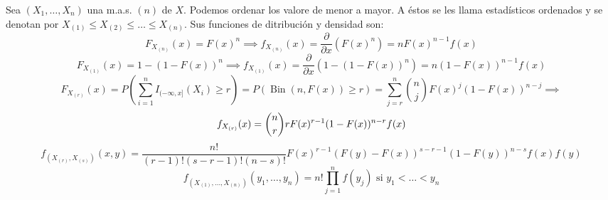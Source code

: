 \begin{definición}
Sea $\left(X_{1}, \ldots, X_{n}\right)$ una m.a.s. $(n)$ de $X$. Podemos ordenar los valore de menor a mayor. A éstos se les llama estadísticos ordenados y se denotan por $X_{(1)} \leq X_{(2)} \leq \ldots \leq X_{(n)}$.
Sus funciones de ditribución y densidad son:
$$F_{X_{(n)}}(x)=F(x)^{n} \implies f_{X_{(n)}}(x)= \frac{\partial}{\partial{x}}(F(x)^n) = n F(x)^{n-1} f(x)$$
$$F_{X_{(1)}}(x)=1-(1-F(x))^{n} \implies f_{X_{(1)}}(x)= \frac{\partial}{\partial{x}}(1-(1-F(x))^n) = n(1-F(x))^{n-1} f(x)$$
$$F_{X_{(r)}}(x) = P\left(\sum_{i=1}^{n} I_{(-\infty, x]}(X_i) \geq r\right) = P(\operatorname{Bin}(n, F(x)) \geq r) = \sum_{j=r}^{n} \binom{n}{j} F(x)^j(1-F(x))^{n-j} \implies$$  $$\\ f_{X_{(r)}}(x) = \binom{n}{r} r F(x)^{r-1}(1-F(x))^{n-r} f(x)$$
$$f_{\left(X_{(r)}, X_{(s)}\right)}(x, y) = \frac{n!}{(r-1)!(s-r-1)!(n-s)!} F(x)^{r-1}(F(y)-F(x))^{s-r-1}(1-F(y))^{n-s} f(x) f(y)$$
$$f_{\left(X_{(1)}, \ldots, X_{(n)}\right)}(y_1, \ldots, y_n) = n! \prod_{j=1}^{n} f(y_j) \text{ si } y_1 < \ldots < y_n$$
\end{definición}

